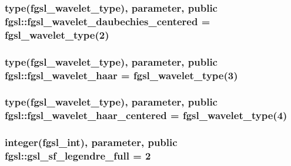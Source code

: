 \subsubsection[{fgsl\+\_\+wavelet\+\_\+daubechies\+\_\+centered}]{\setlength{\rightskip}{0pt plus 5cm}type({\bf fgsl\+\_\+wavelet\+\_\+type}), parameter, public fgsl\+::fgsl\+\_\+wavelet\+\_\+daubechies\+\_\+centered = {\bf fgsl\+\_\+wavelet\+\_\+type}(2)}\label{namespacefgsl_a26df4eaadbaa474bae2dca6abdaea27f}
\hypertarget{namespacefgsl_a416323050493f1845d764b5bf3599477}{}
\subsubsection[{fgsl\+\_\+wavelet\+\_\+haar}]{\setlength{\rightskip}{0pt plus 5cm}type({\bf fgsl\+\_\+wavelet\+\_\+type}), parameter, public fgsl\+::fgsl\+\_\+wavelet\+\_\+haar = {\bf fgsl\+\_\+wavelet\+\_\+type}(3)}\label{namespacefgsl_a416323050493f1845d764b5bf3599477}
\hypertarget{namespacefgsl_a98a440f78f036ed2b35f84992ba0db82}{}
\subsubsection[{fgsl\+\_\+wavelet\+\_\+haar\+\_\+centered}]{\setlength{\rightskip}{0pt plus 5cm}type({\bf fgsl\+\_\+wavelet\+\_\+type}), parameter, public fgsl\+::fgsl\+\_\+wavelet\+\_\+haar\+\_\+centered = {\bf fgsl\+\_\+wavelet\+\_\+type}(4)}\label{namespacefgsl_a98a440f78f036ed2b35f84992ba0db82}
\hypertarget{namespacefgsl_a635161b3c6f02e2821807e5acb512573}{}
\subsubsection[{gsl\+\_\+sf\+\_\+legendre\+\_\+full}]{\setlength{\rightskip}{0pt plus 5cm}integer({\bf fgsl\+\_\+int}), parameter, public fgsl\+::gsl\+\_\+sf\+\_\+legendre\+\_\+full = 2}\label{namespacefgsl_a635161b3c6f02e2821807e5acb512573}
\hypertarget{namespacefgsl_a09eadb78c5f3fc4662d23ac52aaa33b3}{}
